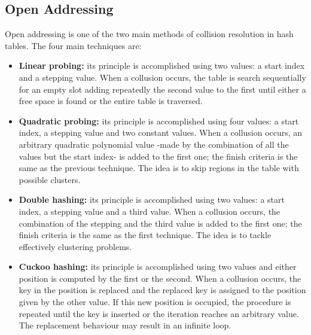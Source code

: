 \documentclass{article}
\begin{document}
    	\subsection{Open Addressing}
Open addressing is one of the two main methods of collision resolution in hash tables. The four main techniques are:

\begin{itemize}
    \item \textbf{Linear probing:} its principle is accomplished using two values: a start index and a stepping value. When a collusion occurs, the table is search sequentially for an empty slot adding repeatedly the second value to the first until either a free space is found or the entire table is traversed.
    \item \textbf{Quadratic probing:} its principle is accomplished using four values: a start index, a stepping value and two constant values. When a collusion occurs, an arbitrary quadratic polynomial value -made by the combination of all the values but the start index- is added to the first one; the finish criteria is the same as the previous technique. The idea is to skip regions in the table with possible clusters.
    \item \textbf{Double hashing:} its principle is accomplished using two values: a start index, a stepping value and a third value. When a collusion occurs, the combination of the stepping and the third value is added to the first one; the finish criteria is the same as the first technique. The idea is to tackle effectively clustering problems.
    \item \textbf{Cuckoo hashing:} its principle is accomplished using two values and either position is computed by the first or the second. When a collusion occurs, the key in the position is replaced and the replaced key is assigned to the position given by the other value. If this new position is occupied, the procedure is repeated until the key is inserted or the iteration reaches an arbitrary value. The replacement behaviour may result in an infinite loop. 
\end{itemize}
\end{document}
